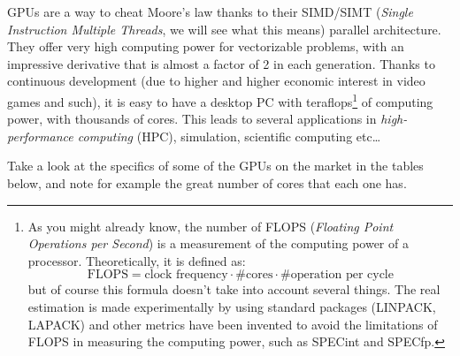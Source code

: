 GPUs are a way to cheat Moore's law thanks to their SIMD/SIMT (\textit{Single Instruction Multiple Threads}, we will see what this means) parallel architecture. They offer very high computing power for vectorizable problems, with an impressive derivative that is almost a factor of 2 in each generation. Thanks to continuous development (due to higher and higher economic interest in video games and such), it is easy to have a desktop PC with teraflops\footnote{As you might already know, the number of FLOPS (\textit{Floating Point Operations per Second}) is a measurement of the computing power of a processor. Theoretically, it is defined as:
$$ \text{FLOPS} = \text{clock frequency} \cdot \text{\# cores} \cdot \text{\# operation per cycle} $$
but of course this formula doesn't take into account several things. The real estimation is made experimentally by using standard packages (LINPACK, LAPACK) and other metrics have been invented to avoid the limitations of FLOPS in measuring the computing power, such as SPECint and SPECfp.} of computing power, with thousands of cores. This leads to several applications in \textit{high-performance computing} (HPC), simulation, scientific computing etc\dots

Take a look at the specifics of some of the GPUs on the market in the tables below, and note for example the great number of cores that each one has. 

